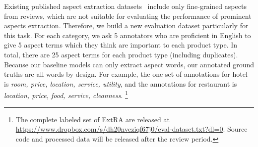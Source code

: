 Existing published aspect extraction datasets~\cite{hu2004mining,popescu2007extracting,pavlopoulos2014aspect,ding2008holistic} 
include only fine-grained aspects from reviews,
which are not suitable for evaluating the performance of 
prominent aspects extraction. 
Therefore, we build a new evaluation dataset particularly 
for this task.
For each category, we ask 5 annotators who are proficient in English 
to give 5 aspect terms which they think are important to each product type.
In total, there are 25 aspect terms
for each product type (including duplicates).
Because our baseline models can only extract aspect words,
our annotated ground truths are all words by design.
For example, the one set of annotations for hotel is 
{\em room, price, location, service, utility}, and the annotations
for restaurant is
{\em location, price, food, service, cleanness}. \footnote{The 
complete labeled set of ExtRA are released at \url{https://www.dropbox.com/s/dh20nvcziqf67j0/eval-dataset.txt?dl=0}.
Source code and processed data will be released after the review period.}

%		
%		



